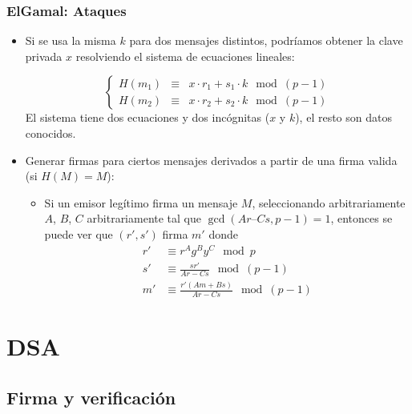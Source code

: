 \documentclass{beamer}
\begin{document}
\begin{frame}
\frametitle{ElGamal: Ataques}

\begin{itemize}
    \item  Si se usa la misma $k$ para dos mensajes distintos, podríamos obtener la clave privada $x$ resolviendo el sistema de ecuaciones lineales:

    \[
        \left\{ \begin{array}{lll}
            H(m_1)&\equiv&x \cdot r_1 + s_1 \cdot k \mod \left(p-1\right) \\
            H(m_2)&\equiv&x \cdot r_2 + s_2 \cdot k \mod \left(p-1\right)
        \end{array}  \right.
    \]
    El sistema tiene dos ecuaciones y dos incógnitas ($x$ y $k$), el resto son datos conocidos.

    \item Generar firmas para ciertos mensajes derivados a partir de una firma valida (si $H(M) = M$):
    \begin{itemize}
        \item Si un emisor legítimo firma un mensaje $M$, seleccionando arbitrariamente $A$, $B$, $C$ arbitrariamente tal que $\gcd(Ar – Cs, p-1)=1$, entonces se puede ver que $(r', s')$ firma $m'$ donde
            \begin{align*}
                r' & \equiv r^A g^B y^C \mod p \\
                s' & \equiv \frac{s r'}{Ar - Cs} \mod \left(p-1\right) \\
                m' & \equiv \frac{r' \left( Am + Bs \right) }{Ar - Cs} \mod \left(p-1\right)
            \end{align*}
    \end{itemize}
\end{itemize}

\end{frame}

\section{DSA}

\subsection{Firma y verificación}
\end{document}
